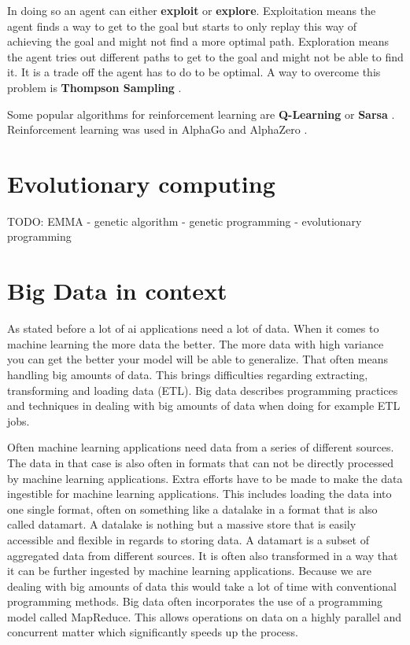 \documentclass[jou,apacite]{apa6}
\begin{document}
In doing so an agent can either \textbf{exploit} or \textbf{explore}. Exploitation means the agent finds a way to get to the goal but starts to only replay this way of achieving the goal and might not find a more optimal path. Exploration means the agent tries out different paths to get to the goal and might not be able to find it. It is a trade off the agent has to do to be optimal. A way to overcome this problem is \textbf{Thompson Sampling} \cite{Chapelle2011}.

Some popular algorithms for reinforcement learning are \textbf{Q-Learning} \cite{Watkins1992} or \textbf{Sarsa} \cite{Berges1995}. Reinforcement learning was used in AlphaGo and AlphaZero \cite{silver2017}.

\section{Evolutionary computing}
TODO: EMMA
- genetic algorithm
- genetic programming
- evolutionary programming

\section{Big Data in context}
As stated before a lot of \gls{ai} applications need a lot of data. When it comes to machine learning the more data the better. The more data with high variance you can get the better your model will be able to generalize. That often means handling big amounts of data. This brings difficulties regarding extracting, transforming and loading data (ETL). Big data describes programming practices and techniques in dealing with big amounts of data when doing for example ETL jobs.

Often machine learning applications need data from a series of different sources. The data in that case is also often in formats that can not be directly processed by machine learning applications. Extra efforts have to be made to make the data ingestible for machine learning applications. This includes loading the data into one single format, often on something like a datalake in a format that is also called datamart. A datalake is nothing but a massive store that is easily accessible and flexible in regards to storing data. A datamart is a subset of aggregated data from different sources. It is often also transformed in a way that it can be further ingested by machine learning applications. Because we are dealing with big amounts of data this would take a lot of time with conventional programming methods. Big data often incorporates the use of a programming model called MapReduce. This allows operations on data on a highly parallel and concurrent matter which significantly speeds up the process.
\end{document}
